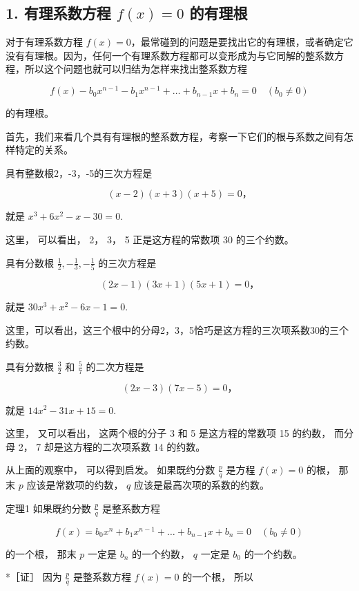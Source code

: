 \subsection{\texorpdfstring{1. 有理系数方程 \(f(x) = 0\) 的有理根}{1. 有理系数方程 f(x) = 0 的有理根}}

对于有理系数方程
\(f(x) = 0\)，最常碰到的问题是要找出它的有理根，或者确定它没有有理根。因为，任何一个有理系数方程都可以变形成为与它同解的整系数方程，所以这个问题也就可以归结为怎样来找出整系数方程

\[
f (x) - b _ {0} x ^ {n - 1} - b _ {1} x ^ {n - 1} + \dots + b _ {n - 1} x + b _ {n} = 0 \quad (b _ {0} \neq 0)
\]

的有理根。

首先，我们来看几个具有有理根的整系数方程，考察一下它们的根与系数之间有怎样特定的关系。

具有整数根2，-3，-5的三次方程是

\[
(x - 2) (x + 3) (x + 5) = 0\text{，}
\]

就是 \(x^{3} + 6x^{2} - x - 30 = 0.\)

这里， 可以看出， 2， 3， 5 正是这方程的常数项 30 的三个约数。

具有分数根 \(\frac{1}{2}, -\frac{1}{3}, -\frac{1}{5}\) 的三次方程是

\[
(2 x - 1) (3 x + 1) (5 x + 1) = 0\text{，}
\]

就是 \(30x^{3} + x^{2} - 6x - 1 = 0.\)

这里，可以看出，这三个根中的分母2，3，5恰巧是这方程的三次项系数30的三个约数。

具有分数根 \(\frac{3}{2}\) 和 \(\frac{5}{7}\) 的二次方程是

\[
(2 x - 3) (7 x - 5) = 0\text{，}
\]

就是 \(14x^{2} - 31x + 15 = 0.\)

这里， 又可以看出， 这两个根的分子 3 和 5 是这方程的常数项 15 的约数，
而分母 2， 7 却是这方程的二次项系数 14 的约数。

从上面的观察中， 可以得到启发。 如果既约分数 \(\frac{p}{q}\) 是方程
\(f(x) = 0\) 的根， 那末 \(p\) 应该是常数项的约数， \(q\)
应该是最高次项的系数的约数。

定理1 如果既约分数 \(\frac{p}{q}\) 是整系数方程

\[
f (x) = b _ {0} x ^ {n} + b _ {1} x ^ {n - 1} + \dots + b _ {n - 1} x + b _ {n} = 0 \quad (b _ {0} \neq 0)
\]

的一个根， 那末 \(p\) 一定是 \(b_{n}\) 的一个约数， \(q\) 一定是
\(b_{0}\) 的一个约数。

*［证］ 因为 \(\frac{p}{q}\) 是整系数方程 \(f(x) = 0\) 的一个根， 所以

